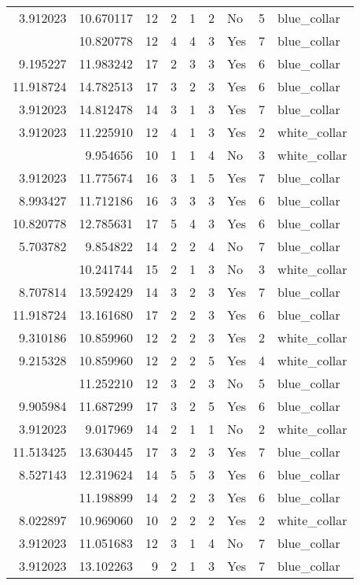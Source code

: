 \documentclass[
]{article}
\begin{document}
\begin{longtable}[t]{rrrrrllrl}
3.912023 & 10.670117 & 12 & 2 & 1 & 2 & No & 5 & blue\_collar\\
\addlinespace
9.619133 & 10.820778 & 12 & 4 & 4 & 3 & Yes & 7 & blue\_collar\\
9.195227 & 11.983242 & 17 & 2 & 3 & 3 & Yes & 6 & blue\_collar\\
11.918724 & 14.782513 & 17 & 3 & 2 & 3 & Yes & 6 & blue\_collar\\
3.912023 & 14.812478 & 14 & 3 & 1 & 3 & Yes & 7 & blue\_collar\\
3.912023 & 11.225910 & 12 & 4 & 1 & 3 & Yes & 2 & white\_collar\\
\addlinespace
3.912023 & 9.954656 & 10 & 1 & 1 & 4 & No & 3 & white\_collar\\
3.912023 & 11.775674 & 16 & 3 & 1 & 5 & Yes & 7 & blue\_collar\\
8.993427 & 11.712186 & 16 & 3 & 3 & 3 & Yes & 6 & blue\_collar\\
10.820778 & 12.785631 & 17 & 5 & 4 & 3 & Yes & 6 & blue\_collar\\
5.703782 & 9.854822 & 14 & 2 & 2 & 4 & No & 7 & blue\_collar\\
\addlinespace
3.912023 & 10.241744 & 15 & 2 & 1 & 3 & No & 3 & white\_collar\\
8.707814 & 13.592429 & 14 & 3 & 2 & 3 & Yes & 7 & blue\_collar\\
11.918724 & 13.161680 & 17 & 2 & 2 & 3 & Yes & 6 & blue\_collar\\
9.310186 & 10.859960 & 12 & 2 & 2 & 3 & Yes & 2 & white\_collar\\
9.215328 & 10.859960 & 12 & 2 & 2 & 5 & Yes & 4 & white\_collar\\
\addlinespace
5.857933 & 11.252210 & 12 & 3 & 2 & 3 & No & 5 & blue\_collar\\
9.905984 & 11.687299 & 17 & 3 & 2 & 5 & Yes & 6 & blue\_collar\\
3.912023 & 9.017969 & 14 & 2 & 1 & 1 & No & 2 & white\_collar\\
11.513425 & 13.630445 & 17 & 3 & 2 & 3 & Yes & 7 & blue\_collar\\
8.527143 & 12.319624 & 14 & 5 & 5 & 3 & Yes & 6 & blue\_collar\\
\addlinespace
7.919356 & 11.198899 & 14 & 2 & 2 & 3 & Yes & 6 & blue\_collar\\
8.022897 & 10.969060 & 10 & 2 & 2 & 2 & Yes & 2 & white\_collar\\
3.912023 & 11.051683 & 12 & 3 & 1 & 4 & No & 7 & blue\_collar\\
3.912023 & 13.102263 & 9 & 2 & 1 & 3 & Yes & 7 & blue\_collar\\

\end{longtable}
\end{document}
